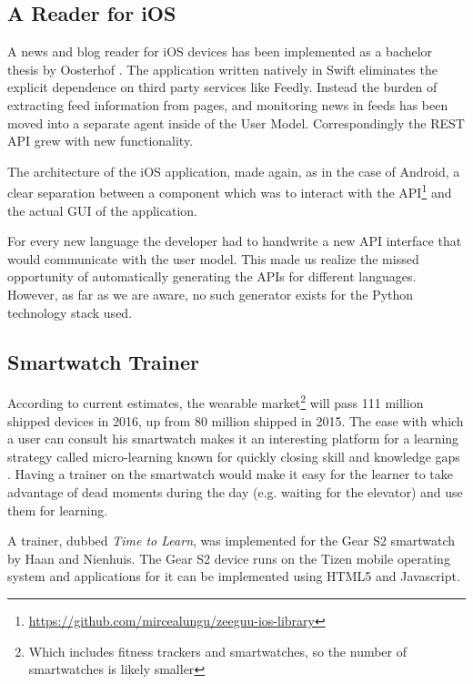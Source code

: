 \documentclass{sig-alternate-05-2015}
\begin{document}
\subsection {A Reader for iOS}

A news and blog reader for iOS devices has been implemented as a bachelor thesis by Oosterhof \cite{Oost16reading}. The application written natively in Swift eliminates the explicit dependence on third party services like Feedly. Instead the burden of extracting feed information from pages, and monitoring news in feeds has been moved into a separate agent inside of the User Model. Correspondingly the REST API grew with new functionality.

The architecture of the iOS application, made again, as in the case of Android, a clear separation between a component which was to interact with the API\footnote{\url{https://github.com/mircealungu/zeeguu-ios-library}} and the actual GUI of the application. 

For every new language the developer had to handwrite a new API interface that would communicate with the user model. This made us realize the missed opportunity of automatically generating the APIs for different languages. However, as far as we are aware, no such generator exists for the Python technology stack used. 



\subsection {Smartwatch Trainer}

According to current estimates, the wearable market\footnote{Which includes fitness trackers and smartwatches, so the number of smartwatches is likely smaller} will pass 111 million shipped devices in 2016, up from 80 million shipped in 2015. The ease with which a user can consult his smartwatch makes it an interesting platform for a learning strategy called micro-learning known for quickly closing skill and knowledge gaps  \cite{Dear12}. Having a trainer on the smartwatch would make it easy for the learner to take advantage of dead moments during the day (e.g. waiting for the elevator) and use them for learning.

A trainer, dubbed {\em Time to Learn}, was implemented for the Gear S2 smartwatch by Haan and Nienhuis\cite{Nien16time}. The Gear S2 device runs on the Tizen mobile operating system and applications for it can be implemented using HTML5 and Javascript.
\end{document}
